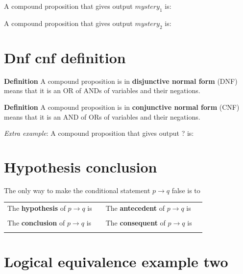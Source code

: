 \documentclass[12pt, oneside]{article}
\begin{document}
A compound proposition that  gives output $mystery_1$ is: \underline{\phantom{\hspace{3in}}}


\vfill


A compound proposition that  gives output $mystery_2$ is: \underline{\phantom{\hspace{3in}}}


\vfill \vfill
\section*{Dnf cnf definition}


{\bf  Definition} A compound proposition is in {\bf disjunctive normal form}  (DNF) means
that  it is an OR of ANDs of variables and their negations.

{\bf  Definition} A compound proposition is in {\bf conjunctive normal form}  (CNF) means
that  it is an AND of ORs of variables and their negations.


{\it Extra example}: A compound proposition that  gives output ? is: 


\vfill
\vfill \vfill
\section*{Hypothesis conclusion}


The only way to make  the conditional statement $p \to q$ false is to \underline{\phantom{\hspace{3in}}}

\begin{tabular}{llll}
The {\bf  hypothesis}  of $p \to q$ is  &\underline{\phantom{\hspace{1in}}} &
The {\bf  antecedent}  of $p \to q$ is  &\underline{\phantom{\hspace{1in}}} \\
&&&  \\
The {\bf  conclusion}  of $p \to q$ is & \underline{\phantom{\hspace{1in}}}&
The {\bf  consequent}  of $p \to q$ is & \underline{\phantom{\hspace{1in}}}\\
&&&  \\
\end{tabular}

\vfill \vfill
\section*{Logical equivalence example two}
\end{document}
